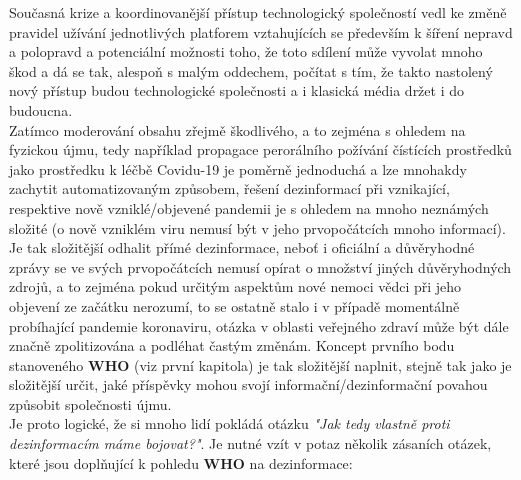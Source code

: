 Současná krize a koordinovanější přístup technologický společností vedl ke změně pravidel užívání jednotlivých platforem vztahujících se především k šíření nepravd a polopravd a potenciální možnosti toho, že toto sdílení může vyvolat mnoho škod a dá se tak, alespoň s malým oddechem, počítat s tím, že takto nastolený nový přístup budou technologické společnosti a i klasická média držet i do budoucna.\\


Zatímco moderování obsahu zřejmě škodlivého, a to zejména s ohledem na fyzickou újmu, tedy například propagace perorálního požívání čístících prostředků jako prostředku k léčbě Covidu-19 je poměrně jednoduchá a lze mnohakdy zachytit automatizovaným způsobem, řešení dezinformací při vznikající, respektive nově vzniklé/objevené pandemii je s ohledem na mnoho neznámých složité (o nově vzniklém viru nemusí být v jeho prvopočátcích mnoho informací). Je tak složitější odhalit přímé dezinformace, neboť i oficiální a důvěryhodné zprávy se ve svých prvopočátcích nemusí opírat o množství jiných důvěryhodných zdrojů, a to zejména pokud určitým aspektům nové nemoci vědci při jeho objevení ze začátku nerozumí, to se ostatně stalo i v případě momentálně probíhající pandemie koronaviru, otázka v oblasti veřejného zdraví může být dále značně zpolitizována a podléhat častým změnám. Koncept prvního bodu stanoveného \textbf{WHO} (viz první kapitola) je tak složitější naplnit, stejně tak jako je složitější určit, jaké příspěvky mohou svojí informační/dezinformační povahou způsobit společnosti újmu.\\

Je proto logické, že si mnoho lidí pokládá otázku \textit{"Jak tedy vlastně proti dezinformacím máme bojovat?"}. Je nutné vzít v potaz několik zásaních otázek, které jsou doplňující k pohledu \textbf{WHO} na dezinformace:\\

